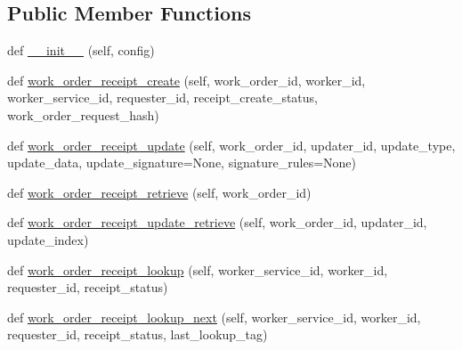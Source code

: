 \subsection*{Public Member Functions}
\begin{DoxyCompactItemize}
\item 
def \hyperlink{classavalon__sdk_1_1connector_1_1blockchains_1_1fabric_1_1fabric__work__order__receipt_1_1FabricWorkOrderReceiptImpl_a06a1df66265840c2c64c558b60bebd45}{\+\_\+\+\_\+init\+\_\+\+\_\+} (self, config)
\item 
def \hyperlink{classavalon__sdk_1_1connector_1_1blockchains_1_1fabric_1_1fabric__work__order__receipt_1_1FabricWorkOrderReceiptImpl_ac7f4b79a522498b5a080714988521b15}{work\+\_\+order\+\_\+receipt\+\_\+create} (self, work\+\_\+order\+\_\+id, worker\+\_\+id, worker\+\_\+service\+\_\+id, requester\+\_\+id, receipt\+\_\+create\+\_\+status, work\+\_\+order\+\_\+request\+\_\+hash)
\item 
def \hyperlink{classavalon__sdk_1_1connector_1_1blockchains_1_1fabric_1_1fabric__work__order__receipt_1_1FabricWorkOrderReceiptImpl_aa9e77f500bd71b6d7ab0af28bf34b159}{work\+\_\+order\+\_\+receipt\+\_\+update} (self, work\+\_\+order\+\_\+id, updater\+\_\+id, update\+\_\+type, update\+\_\+data, update\+\_\+signature=None, signature\+\_\+rules=None)
\item 
def \hyperlink{classavalon__sdk_1_1connector_1_1blockchains_1_1fabric_1_1fabric__work__order__receipt_1_1FabricWorkOrderReceiptImpl_af6f8879cf963e054ced76ec4dd31fe0c}{work\+\_\+order\+\_\+receipt\+\_\+retrieve} (self, work\+\_\+order\+\_\+id)
\item 
def \hyperlink{classavalon__sdk_1_1connector_1_1blockchains_1_1fabric_1_1fabric__work__order__receipt_1_1FabricWorkOrderReceiptImpl_a288cd2f592b3c3fa4c240620799f5004}{work\+\_\+order\+\_\+receipt\+\_\+update\+\_\+retrieve} (self, work\+\_\+order\+\_\+id, updater\+\_\+id, update\+\_\+index)
\item 
def \hyperlink{classavalon__sdk_1_1connector_1_1blockchains_1_1fabric_1_1fabric__work__order__receipt_1_1FabricWorkOrderReceiptImpl_a98f17b6c621a9c8c591580104aa0b7c5}{work\+\_\+order\+\_\+receipt\+\_\+lookup} (self, worker\+\_\+service\+\_\+id, worker\+\_\+id, requester\+\_\+id, receipt\+\_\+status)
\item 
def \hyperlink{classavalon__sdk_1_1connector_1_1blockchains_1_1fabric_1_1fabric__work__order__receipt_1_1FabricWorkOrderReceiptImpl_a559c919a4a124991398d727c0a16f234}{work\+\_\+order\+\_\+receipt\+\_\+lookup\+\_\+next} (self, worker\+\_\+service\+\_\+id, worker\+\_\+id, requester\+\_\+id, receipt\+\_\+status, last\+\_\+lookup\+\_\+tag)
\end{DoxyCompactItemize}
